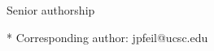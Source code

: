 \documentclass[10pt,letterpaper]{article}
\begin{document}
\begin{flushleft}
%
%

\ddag Senior authorship




* Corresponding author: jpfeil@ucsc.edu

\end{flushleft}
\end{document}
